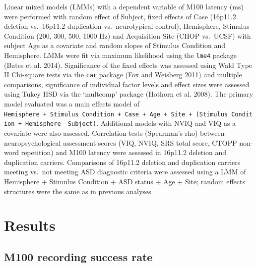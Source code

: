 \documentclass[]{article}
\begin{document}
Linear mixed models (LMMs) with a dependent variable of M100 latency
(ms) were performed with random effect of Subject, fixed effects of Case
(16p11.2 deletion vs.~16p11.2 duplication vs.~neurotypical control),
Hemisphere, Stimulus Condition (200, 300, 500, 1000 Hz) and Acquisition
Site (CHOP vs.~UCSF) with subject Age as a covariate and random slopes
of Stimulus Condition and Hemisphere. LMMs were fit via maximum
likelihood using the \texttt{lme4} package (Bates et al. 2014).
Significance of the fixed effects was assessed using Wald Type II
Chi-square tests via the \texttt{car} package (Fox and Weisberg 2011)
and multiple comparisons, significance of individual factor levels and
effect sizes were assessed using Tukey HSD via the `multcomp' package
(Hothorn et al. 2008). The primary model evaluated was a main effects
model of
\texttt{Hemisphere\ +\ Stimulus\ Condition\ +\ Case\ +\ Age\ +\ Site\ +\ (Stimulus\ Condition\ +\ Hemisphere\ \textbar{}\ Subject)}.
Additional models with NVIQ and VIQ as a covariate were also assessed.
Correlation tests (Spearman's rho) between neuropsychological assessment
scores (VIQ, NVIQ, SRS total score, CTOPP non-word repetition) and M100
latency were assessed in 16p11.2 deletion and duplication carriers.
Comparisons of 16p11.2 deletion and duplication carriers meeting vs.~not
meeting ASD diagnostic criteria were assessed using a LMM of Hemisphere
+ Stimulus Condition + ASD status + Age + Site; random effects
structures were the same as in previous analyses.

\section{Results}\label{results}

\subsection{M100 recording success
rate}\label{m100-recording-success-rate}
\end{document}
